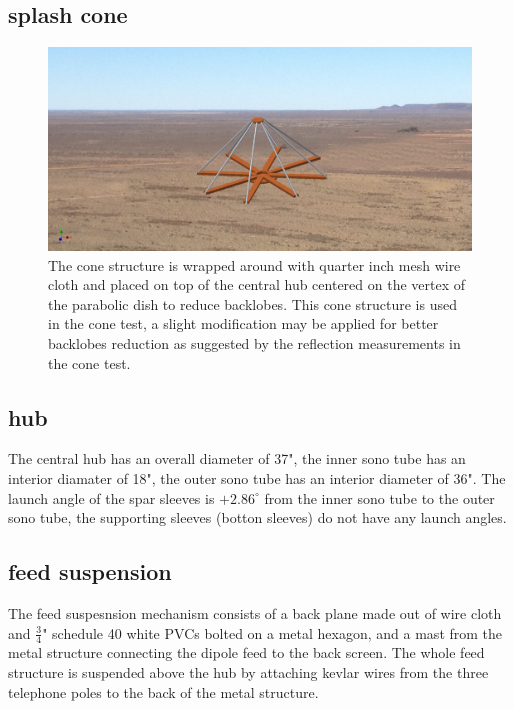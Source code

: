 \documentclass[preprint]{aastex}  %
\begin{document}
\subsection{splash cone}
\begin{figure}[H]
	\begin{center}
	\includegraphics[width =\textwidth]{./dish_plots/splashAssembly}
	\caption{The cone structure is wrapped around with quarter inch mesh wire cloth and placed on top of the central hub centered on the vertex of the parabolic dish to reduce backlobes. This cone structure is used in the cone test, a slight modification may be applied for better backlobes reduction as suggested by the reflection measurements in the cone test. 
\label{Fig:splashcone} }
	\end{center}
\end{figure}
\clearpage

\subsection{hub}
The central hub has an overall diameter of 37", the inner sono tube has an interior diamater of 18", the outer sono tube has an interior diameter of 36". The launch angle of the spar sleeves is $+2.86^{\circ}$ from the inner sono tube to the outer sono tube, the supporting sleeves (botton sleeves) do not have any launch angles.


\subsection {feed suspension}
The feed suspesnsion mechanism consists of a back plane made out of wire cloth and $\frac{3}{4}$" schedule 40 white PVCs bolted on a metal hexagon, and a mast from the metal structure connecting the dipole feed to the back screen. The whole feed structure is suspended above the hub by attaching kevlar wires from the three telephone poles to the back of the metal structure. 
\end{document}
